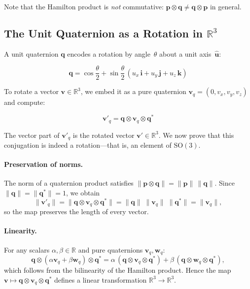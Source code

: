 \noindent Note that the Hamilton product is \emph{not} commutative:
$\mathbf{p} \otimes \mathbf{q} \neq \mathbf{q} \otimes \mathbf{p}$ in general.

\subsection{The Unit Quaternion as a Rotation in $\mathbb{R}^3$}
\label{sec:quat:rotation}

A unit quaternion $\mathbf{q}$ encodes a rotation by angle~$\theta$ about a
unit axis~$\hat{\mathbf{u}}$:

\begin{equation}
  \mathbf{q} = \cos\frac{\theta}{2}
             + \sin\frac{\theta}{2}\,
               (u_x\,\mathbf{i} + u_y\,\mathbf{j} + u_z\,\mathbf{k})
  \label{eq:axis_angle}
\end{equation}

To rotate a vector $\mathbf{v} \in \mathbb{R}^3$, we embed it as a pure
quaternion $\mathbf{v}_q = (0, v_x, v_y, v_z)$ and compute:

\begin{equation}
  \mathbf{v}'_q = \mathbf{q} \otimes \mathbf{v}_q \otimes \mathbf{q}^*
  \label{eq:rotation}
\end{equation}

\noindent The vector part of $\mathbf{v}'_q$ is the rotated vector
$\mathbf{v}' \in \mathbb{R}^3$.  We now prove that this conjugation is
indeed a rotation---that is, an element of $\mathrm{SO}(3)$.

\paragraph{Preservation of norms.}
The norm of a quaternion product satisfies
$\|\mathbf{p}\otimes\mathbf{q}\| = \|\mathbf{p}\|\,\|\mathbf{q}\|$.
Since $\|\mathbf{q}\|=\|\mathbf{q}^*\|=1$, we obtain
\begin{equation}
  \|\mathbf{v}'_q\|
  = \|\mathbf{q}\otimes\mathbf{v}_q\otimes\mathbf{q}^*\|
  = \|\mathbf{q}\|\;\|\mathbf{v}_q\|\;\|\mathbf{q}^*\|
  = \|\mathbf{v}_q\|,
  \label{eq:norm_preservation}
\end{equation}
so the map preserves the length of every vector.

\paragraph{Linearity.}
For any scalars $\alpha,\beta\in\mathbb{R}$ and pure quaternions
$\mathbf{v}_q,\mathbf{w}_q$:
\begin{equation}
  \mathbf{q}\otimes(\alpha\mathbf{v}_q+\beta\mathbf{w}_q)\otimes\mathbf{q}^*
  = \alpha\,(\mathbf{q}\otimes\mathbf{v}_q\otimes\mathbf{q}^*)
  + \beta\,(\mathbf{q}\otimes\mathbf{w}_q\otimes\mathbf{q}^*),
  \label{eq:linearity}
\end{equation}
which follows from the bilinearity of the Hamilton product.  Hence the map
$\mathbf{v}\mapsto\mathbf{q}\otimes\mathbf{v}_q\otimes\mathbf{q}^*$
defines a linear transformation $\mathbb{R}^3\to\mathbb{R}^3$.

